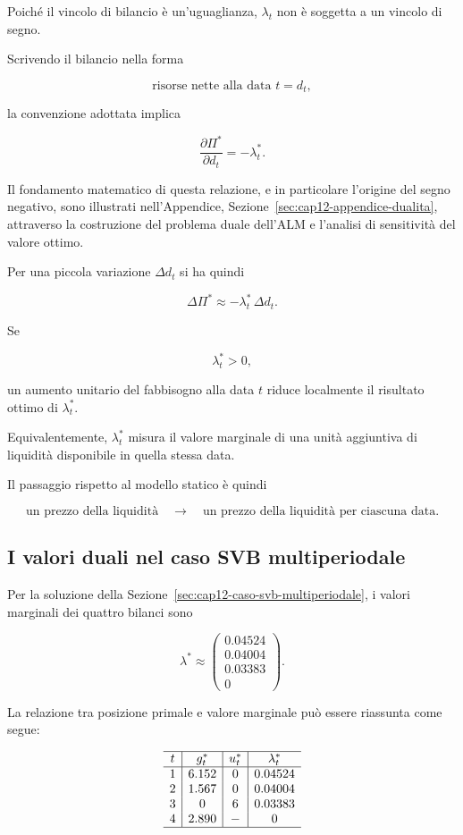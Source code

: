 Poich\'e il vincolo di bilancio \`e un'uguaglianza, $\lambda_t$ non \`e
soggetta a un vincolo di segno.

Scrivendo il bilancio nella forma

\[
\text{risorse nette alla data }t=d_t,
\]

\noindent la convenzione adottata implica

\[
\frac{\partial\Pi^*}{\partial d_t}
=
-\lambda_t^*.
\]

Il fondamento matematico di questa relazione,
e in particolare l'origine del segno negativo,
sono illustrati nell'Appendice,
Sezione~\ref{sec:cap12-appendice-dualita},
attraverso la costruzione del problema duale
dell'ALM e l'analisi di sensitivit\`{a}
del valore ottimo.

Per una piccola variazione $\Delta d_t$ si ha quindi

\[
\Delta\Pi^*
\approx
-\lambda_t^*\,\Delta d_t.
\]

Se

\[
\lambda_t^*>0,
\]

\noindent un aumento unitario del fabbisogno alla data $t$ riduce localmente il
risultato ottimo di $\lambda_t^*$.

Equivalentemente, $\lambda_t^*$ misura il valore marginale di una unit\`a
aggiuntiva di liquidit\`a disponibile in quella stessa data.

Il passaggio rispetto al modello statico \`e quindi

\[
\boxed{
\text{un prezzo della liquidit\`a}
\quad\longrightarrow\quad
\text{un prezzo della liquidit\`a per ciascuna data}.
}
\]

\subsection{I valori duali nel caso SVB multiperiodale}

Per la soluzione della Sezione~\ref{sec:cap12-caso-svb-multiperiodale}, i
valori marginali dei quattro bilanci sono

\[
\lambda^*
\approx
\begin{pmatrix}
0.04524\\
0.04004\\
0.03383\\
0
\end{pmatrix}.
\]

La relazione tra posizione primale e valore marginale pu\`o essere riassunta
come segue:

\[
\begin{array}{c|c|c|c}
\hline
t & g_t^* & u_t^* & \lambda_t^*\\
\hline
1 & 6.152 & 0 & 0.04524\\
2 & 1.567 & 0 & 0.04004\\
3 & 0     & 6 & 0.03383\\
4 & 2.890 & - & 0\\
\hline
\end{array}
\]

